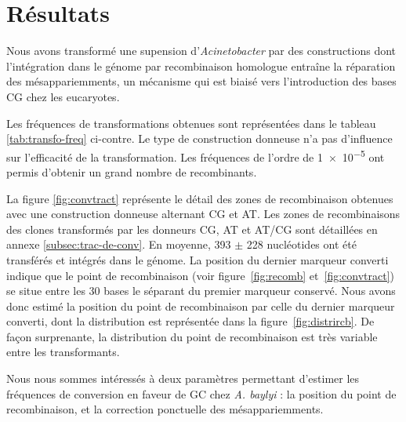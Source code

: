 \section{Résultats}
\label{sec:resultats}

Nous avons transformé une supension d'\emph{Acinetobacter} par des constructions
dont l'intégration dans le génome par recombinaison homologue entraîne la
réparation des mésappariemments, un mécanisme qui est biaisé vers l'introduction
des bases CG chez les eucaryotes.

Les fréquences de transformations obtenues sont représentées dans le tableau
\ref{tab:transfo-freq} ci-contre. Le type de construction
donneuse n'a pas d'influence sur l'efficacité de la transformation. Les
fréquences de l'ordre de \num{1e-5} ont permis d'obtenir un grand nombre de
recombinants.

La figure \ref{fig:convtract} représente le détail des zones de recombinaison
obtenues avec une construction donneuse alternant CG et AT. Les zones de
recombinaisons des clones transformés par les donneurs CG, AT et AT/CG sont
détaillées en annexe \ref{subsec:trac-de-conv}. En moyenne, \num{393} \(\pm\)
\num{228} nucléotides ont été transférés et intégrés dans le génome. La position
du dernier marqueur converti indique que le point de recombinaison (voir
figure~\ref{fig:recomb} et~\ref{fig:convtract}) se situe entre les 30 bases le
séparant du premier marqueur conservé. Nous avons donc estimé la position du
point de recombinaison par celle du dernier marqueur converti, dont la
distribution est représentée dans la figure~\ref{fig:distrircb}. De façon
surprenante, la distribution du point de recombinaison est très variable entre
les transformants.

Nous nous sommes intéressés à deux paramètres permettant d'estimer les
fréquences de conversion en faveur de GC chez \emph{A. baylyi} : la position du
point de recombinaison, et la correction ponctuelle des mésappariemments.

